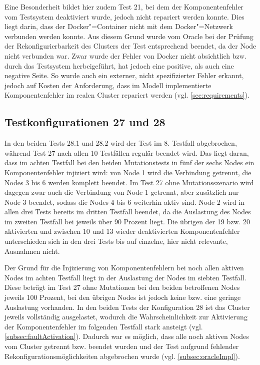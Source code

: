 Eine Besonderheit bildet hier zudem \gls{Test} 21, bei dem der Komponentenfehler vom Testsystem deaktiviert wurde, jedoch nicht repariert werden konnte.
Dies liegt darin, dass der Docker"=Container nicht mit dem Docker"=Netzwerk verbunden werden konnte.
Aus diesem Grund wurde vom Oracle bei der Prüfung der Rekonfigurierbarkeit des Clusters der \gls{Test} entsprechend beendet, da der Node nicht verbunden war.
Zwar wurde der Fehler von Docker nicht absichtlich bzw. durch das Testsystem herbeigeführt, hat jedoch eine positive, als auch eine negative Seite.
So wurde auch ein externer, nicht spezifizierter Fehler erkannt, jedoch auf Kosten der Anforderung, dass im Modell implementierte Komponentenfehler im realen Cluster repariert werden (vgl. \cref{sec:requirements}).

\subsection{Testkonfigurationen 27 und 28}
\label{subsec:noReconf2728}

In den beiden \glspl{Test} 28.1 und 28.2 wird der \gls{Test} im 8. \gls{Testfall} abgebrochen, während \gls{Test} 27 nach allen 10 Testfällen regulär beendet wird.
Das liegt daran, dass im achten \gls{Testfall} bei den beiden Mutationstests in fünf der sechs Nodes ein Komponentenfehler injiziert wird: von Node 1 wird die Verbindung getrennt, die Nodes 3 bis 6 werden komplett beendet.
Im \gls{Test} 27 ohne Mutationsszenario wird dagegen zwar auch die Verbindung von Node 1 getrennt, aber zusätzlich nur Node 3 beendet, sodass die Nodes 4 bis 6 weiterhin aktiv sind.
Node 2 wird in allen drei \glspl{Test} bereits im dritten \gls{Testfall} beendet, da die Auslastung des Nodes im zweiten \gls{Testfall} bei jeweils über 90 Prozent liegt.
Die übrigen der 19 bzw. 20 aktivierten und zwischen 10 und 13 wieder deaktivierten Komponentenfehler unterschieden sich in den drei \glspl{Test} bis auf einzelne, hier nicht relevante, Ausnahmen nicht.

Der Grund für die Injizierung von Komponentenfehlern bei noch allen aktiven Nodes im achten \gls{Testfall} liegt in der Auslastung der Nodes im siebten Testfall.
Diese beträgt im \gls{Test} 27 ohne Mutationen bei den beiden betroffenen Nodes jeweils 100 Prozent, bei den übrigen Nodes ist jedoch keine bzw. eine geringe Auslastung vorhanden.
In den beiden \glspl{Test} der Konfiguration 28 ist das Cluster jeweils vollständig ausgelastet, wodurch die Wahrscheinlichkeit zur Aktivierung der Komponentenfehler im folgenden \gls{Testfall} stark ansteigt (vgl. \cref{subsec:faultActivation}).
Dadurch war es möglich, dass alle noch aktiven Nodes vom Cluster getrennt bzw. beendet wurden und der \gls{Test} aufgrund fehlender Rekonfigurationsmöglichkeiten abgebrochen wurde (vgl. \cref{subsec:oracleImpl}).

